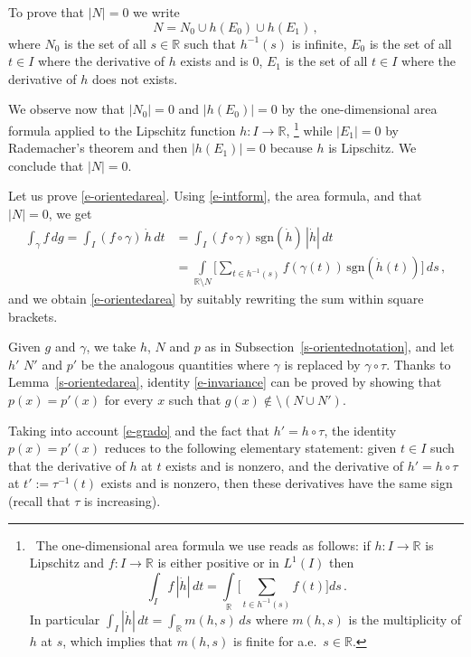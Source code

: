 \documentclass[11pt,reqno,a4paper,final]{amsart}
\makeatletter
\numberwithin{equation}{section}
\theoremstyle{mytheorem}
\theoremstyle{myremark}
\theoremstyle{myparagraph}
\renewenvironment{proof}[1][\proofname]{\par 
  \pushQED{\qed}%
  \normalfont \topsep10\p@\@plus6\p@\relax 
  \trivlist 
  \item[\hskip\labelsep 
    \bfseries 
    #1\@addpunct{.}]\ignorespaces 
}{%
  \popQED\endtrivlist\@endpefalse 
}
\providecommand{\proofname}{Proof}
\newcommand{\footnoteb}[1]{\footnote{~#1}}
\newcommand{\R}{\mathbb{R}}
\newcommand{\sgn}{\mathrm{sgn}}
\makeatother
\begin{document}
\begin{proof}
To prove that $|N|=0$ we write 
\[
N=N_0\cup h(E_0) \cup h(E_1)
\, , 
\]
where $N_0$ is the set of all $s\in\R$ such that $h^{-1}(s)$ is infinite, 
$E_0$ is the set of all $t\in I$ where the derivative of $h$ exists 
and is $0$, $E_1$ is the set of all $t\in I$ where the derivative of 
$h$ does not exists.

We observe now that $|N_0|=0$ and $|h(E_0)|=0$ 
by the one-dimensional area formula applied 
to the Lipschitz function $h:I\to\R$,%
%
\footnoteb
{The one-dimensional area formula we use reads as follows: if $h:I\to\R$ is 
Lipschitz and $f:I\to\R$ is either positive or in $L^1(I)$ then 
\[
\int_I f \, |\dot h| \, dt = \int\limits_\R \bigg[ \sum_{t\in h^{-1}(s)} f(t) \bigg] ds
\, .
\]
In particular $\int_I |\dot h| \, dt = \int_\R m(h,s) \, ds$ where 
$m(h,s)$ is the multiplicity of $h$ at $s$, which implies that $m(h,s)$ is finite 
for a.e.~$s\in\R$.}
%  
while $|E_1|=0$ by Rademacher's theorem and then 
$|h(E_1)|=0$ because $h$ is Lipschitz.
We conclude that $|N|=0$.

\smallskip
Let us prove \eqref{e-orientedarea}. 
Using \eqref{e-intform}, the area formula, and that $|N|=0$,
we get
%
\begin{align*}
   \int_\gamma f \, dg
  =\int_I (f\circ\gamma) \, \dot{h} \, dt 
& =\int_I (f\circ\gamma) \, \sgn(\dot{h}) 
        \, |\dot{h}| \, dt \\
& =\int\limits_{\R\setminus N} \bigg[ 
             \sum_{t\in h^{-1}(s)} f(\gamma(t)) \, \sgn(\dot{h}(t)) 
         \bigg] \, ds
  \, , 
\end{align*}
%
and we obtain \eqref{e-orientedarea} by suitably rewriting the
sum within square brackets.
\end{proof}



\begin{proof}[Proof of Proposition~\ref{s-degzeroprop}(i)]
Given $g$ and $\gamma$, we take $h$, $N$ and $p$ as in 
Subsection~\ref{s-orientednotation}, and let $h'$ $N'$ and $p'$ be 
the analogous quantities where $\gamma$ is replaced 
by $\gamma\circ\tau$. 
Thanks to Lemma~\ref{s-orientedarea}, 
identity \eqref{e-invariance} can be proved by showing that
$p(x)=p'(x)$ for every $x$ such that $g(x)\notin\setminus(N\cup N')$.

Taking into account \eqref{e-grado} and the fact that $h'=h\circ\tau$, 
the identity $p(x)=p'(x)$ reduces to the following elementary statement:
given $t\in I$ such that the derivative of $h$ at $t$ exists and is nonzero, 
and the derivative of $h'=h\circ\tau$ at $t':=\tau^{-1}(t)$ exists and is nonzero, 
then these derivatives have the same sign (recall that $\tau$ is increasing). 
\end{proof}
\end{document}
